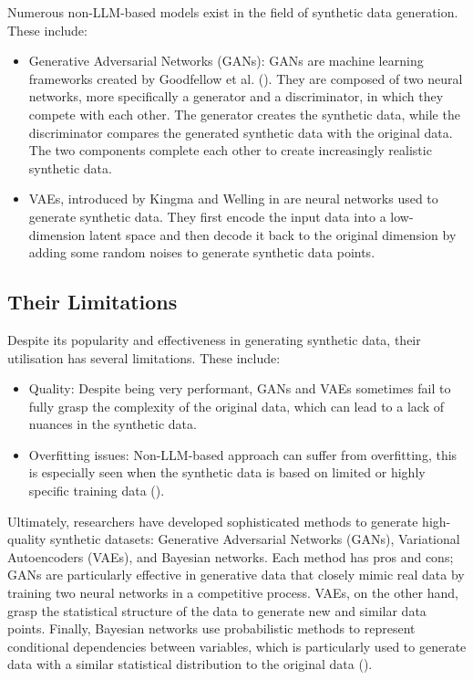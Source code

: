 Numerous non-LLM-based models exist in the field of synthetic data generation. These include:

\begin{itemize}
    \item Generative Adversarial Networks (GANs): GANs are machine learning frameworks created by Goodfellow et al. (\cite{goodfellow2014generative}). They are composed of two neural networks, more specifically a generator and a discriminator, in which they compete with each other. The generator creates the synthetic data, while the discriminator compares the generated synthetic data with the original data. The two components complete each other to create increasingly realistic synthetic data.

    \item VAEs, introduced by Kingma and Welling in \cite{Kingma2014} are neural networks used to generate synthetic data. They first encode the input data into a low-dimension latent space and then decode it back to the original dimension by adding some random noises to generate synthetic data points.
\end{itemize}


\subsection{Their Limitations}

Despite its popularity and effectiveness in generating synthetic data, their utilisation has several limitations. These include:

\begin{itemize}
    \item Quality: Despite being very performant, GANs and VAEs sometimes fail to fully grasp the complexity of the original data, which can lead to a lack of nuances in the synthetic data.
    \item Overfitting issues: Non-LLM-based approach can suffer from overfitting, this is especially seen when the synthetic data is based on limited or highly specific training data (\cite{Salimans2016}).
\end{itemize}



Ultimately, researchers have developed sophisticated methods to generate high-quality synthetic datasets: Generative Adversarial Networks (GANs), Variational Autoencoders (VAEs), and Bayesian networks. Each method has pros and cons; GANs are particularly effective in generative data that closely mimic real data by training two neural networks in a competitive process. VAEs, on the other hand, grasp the statistical structure of the data to generate new and similar data points. Finally, Bayesian networks use probabilistic methods to represent conditional dependencies between variables, which is particularly used to generate data with a similar statistical distribution to the original data (\cite{Davila2024}).








